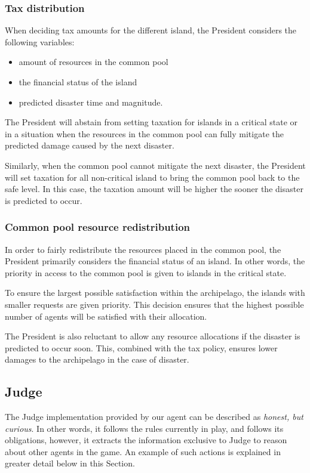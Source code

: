 \subsubsection{Tax distribution}
When deciding tax amounts for the different island, the President considers the following variables:
\begin{itemize}
    \item amount of resources in the common pool
    \item the financial status of the island
    \item predicted disaster time and magnitude.
\end{itemize}

The President will abstain from setting taxation for islands in a critical state or in a situation when the resources in the common pool can fully mitigate the predicted damage caused by the next disaster. 

Similarly, when the common pool cannot mitigate the next disaster, the President will set taxation for all non-critical island to bring the common pool back to the safe level. In this case, the taxation amount will be higher the sooner the disaster is predicted to occur.

\subsubsection{Common pool resource redistribution}
In order to fairly redistribute the resources placed in the common pool, the President primarily considers the financial status of an island. In other words, the priority in access to the common pool is given to islands in the critical state. 

To ensure the largest possible satisfaction within the archipelago, the islands with smaller requests are given priority. This decision ensures that the highest possible number of agents will be satisfied with their allocation.

The President is also reluctant to allow any resource allocations if the disaster is predicted to occur soon. This, combined with the tax policy, ensures lower damages to the archipelago in the case of disaster.


\subsection{Judge}
\label{subsec:team4:judge}
The Judge implementation provided by our agent can be described as \emph{honest, but curious}. In other words, it follows the rules currently in play, and follows its obligations, however, it extracts the information exclusive to Judge to reason about other agents in the game. An example of such actions is explained in greater detail below in this Section.

